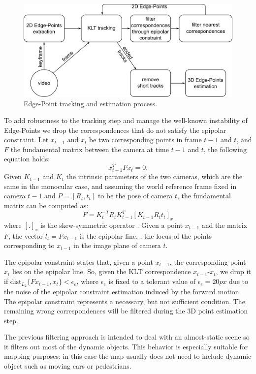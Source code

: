 \begin{figure}[t]
\centering
\includegraphics[width=0.9\columnwidth]{./img//EdgePoint}
\caption{Edge-Point tracking and estimation process.}
\label{fig:algorithm}
\end{figure}

To add robustness to the tracking step and manage the well-known instability  of Edge-Points  we drop the correspondences that do not satisfy the epipolar constraint. 
Let $x_{t-1}$ and $x_t$ be two corresponding points in frame $t-1$ and $t$, and $F$ the fundamental matrix between the camera at time $t-1$ and $t$, the following equation holds:
\[
 x_{t-1}^{T}Fx_t = 0 .
\]
Given $K_{t-1}$ and $K_t$ the intrinsic parameters of the two cameras, which are the same in the monocular case, and assuming the world reference frame fixed in camera $t-1$ and $P = [R_t,t_t]$ to be the pose of camera $t$, the fundamental matrix can be computed as:
\[
F = K_t^{-T}R_tK_{t-1}^T [K_{t-1}R_{t}t_t]_x
\]
where $[.]_x$ is the skew-symmetric operator \cite{hazi04}.
Given a point $x_{t-1}$ and the matrix $F$, the vector $l_{t} = Fx_{t-1}$ is the epipolar line, \ie, the locus of the points corresponding to $x_{t-1}$ in the image plane of camera $t$. 

The epipolar constraint states that, given a point $x_{t-1}$, the corresponding point $x_{t}$ lies on the epipolar line. So, given the KLT correspondence $x_{t-1}$-${x}_{t}$, we drop it if $\text{dist}_{L_2}\{Fx_{t-1}, {x}_{t}\} <\epsilon_e$, where $\epsilon_e$ is fixed to a tolerant value of $\epsilon_e = 20px$ due to the noise of the epipolar constraint estimation induced by the forward motion.
The epipolar constraint represents a necessary, but not sufficient condition. The remaining wrong correspondences will be filtered during the 3D point estimation step.

The previous filtering approach is intended to deal with an almost-static scene so it filters out most of  the dynamic objects. This behavior is especially suitable for mapping purposes: in this case the map usually does not need to include dynamic object such as moving cars or pedestrians. 


